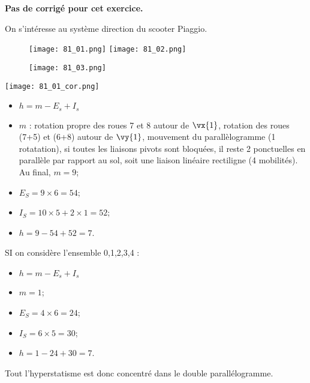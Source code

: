 \normaltrue \difficilefalse \tdifficilefalse
\correctionfalse

\setcounter{numques}{0}


\ifcorrection
\else
\textbf{Pas de corrigé pour cet exercice.}
\fi


\ifprof
\else
On s'intéresse au système direction du scooter Piaggio.

\begin{figure}[H]
\centering
\texttt{[image: 81\_01.png]}
\texttt{[image: 81\_02.png]}
\end{figure} 



\begin{figure}[H]
\centering
\texttt{[image: 81\_03.png]}
\end{figure} 
\fi

\ifprof
\begin{center}
\texttt{[image: 81\_01\_cor.png]}
\end{center}
\else
\fi

\ifprof
\begin{itemize}
\item $h = m -E_s + I_s$ 
\item $m$ : rotation propre des roues 7 et 8 autour de $\vx{1}$, rotation des roues (7+5) et (6+8) autour de $\vy{1}$,  mouvement du parallèlogramme (1 rotatation), si toutes les liaisons pivots sont bloquées, il reste 2 ponctuelles en parallèle par rapport au sol, soit une liaison linéaire rectiligne (4 mobilités). Au final, $m=9$;
\item $E_S =9\times 6 = 54$;
\item $I_S = 10\times 5 + 2 \times 1 = 52$;
\item $h = 9 -54 + 52 = 7$.
\end{itemize}
\else
\fi
{}
\ifprof
SI on considère l'ensemble 0,1,2,3,4 : 
\begin{itemize}
\item $h = m -E_s + I_s$ 
\item $m = 1$; 
\item $E_S =4\times 6 = 24$;
\item $I_S = 6\times 5  = 30$;
\item $h = 1 -24 + 30 = 7$. 
\end{itemize}
Tout l'hyperstatisme est donc concentré dans le double parallélogramme. 


